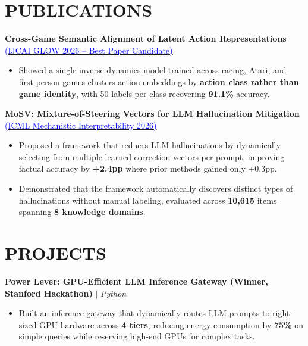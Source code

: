 \documentclass[10pt, letterpaper]{article}
\begin{document}
\section{PUBLICATIONS}

\textbf{Cross-Game Semantic Alignment of Latent Action Representations}
\href{https://feolukolawole.com/Cross-Game_Semantic_Alignment.pdf}{\textcolor{blue}{(IJCAI GLOW 2026 -- Best Paper Candidate)}}
\begin{itemize}[leftmargin=1.5em, topsep=2pt, itemsep=1pt, parsep=0pt]
  \item Showed a single inverse dynamics model trained across racing, Atari, and first-person games clusters action embeddings by \textbf{action class rather than game identity}, with 50 labels per class recovering \textbf{91.1\%} accuracy.
\end{itemize}

\smallskip

\textbf{MoSV: Mixture-of-Steering Vectors for LLM Hallucination Mitigation}
\href{https://openreview.net/forum?id=6RLSD6GnJC}{\textcolor{blue}{(ICML Mechanistic Interpretability 2026)}}
\begin{itemize}[leftmargin=1.5em, topsep=2pt, itemsep=1pt, parsep=0pt]
  \item Proposed a framework that reduces LLM hallucinations by dynamically selecting from multiple learned
  correction vectors per prompt, improving factual accuracy by \textbf{+2.4pp} where prior methods gained only +0.3pp.
  \item Demonstrated that the framework automatically discovers distinct types of hallucinations without manual
  labeling, evaluated across \textbf{10,615} items spanning \textbf{8 knowledge domains}.
\end{itemize}

\section{PROJECTS}

\textbf{Power Lever: GPU-Efficient LLM Inference Gateway (Winner, Stanford Hackathon)} $|$ \textit{Python}
\begin{itemize}[leftmargin=1.5em, topsep=2pt, itemsep=1pt, parsep=0pt]
  \item Built an inference gateway that dynamically routes LLM prompts to right-sized GPU hardware across
  \textbf{4 tiers}, reducing energy consumption by \textbf{75\%} on simple queries while reserving high-end GPUs for complex tasks.
\end{itemize}
\end{document}
